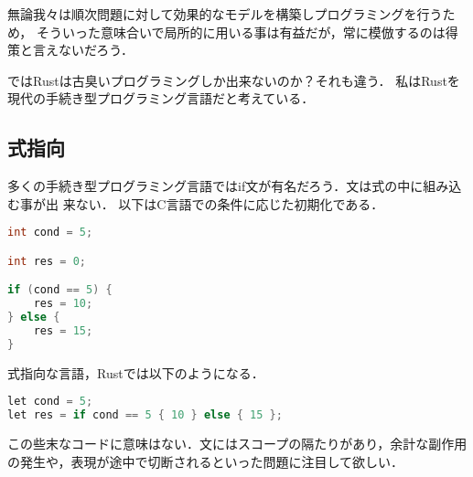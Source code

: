 無論我々は順次問題に対して効果的なモデルを構築しプログラミングを行うため，
そういった意味合いで局所的に用いる事は有益だが，常に模倣するのは得策と言えないだろう．

ではRustは古臭いプログラミングしか出来ないのか？それも違う．
私はRustを現代の手続き型プログラミング言語だと考えている．


\subsection{式指向}
多くの手続き型プログラミング言語ではif文が有名だろう．文は式の中に組み込む事が出
来ない．
以下はC言語での条件に応じた初期化である．

\begin{lstlisting}[language={C},caption=Cにおけるif文,label=c_if]
int cond = 5;

int res = 0;

if (cond == 5) {
    res = 10;
} else {
    res = 15;
}
\end{lstlisting}

式指向な言語，Rustでは以下のようになる．

\begin{lstlisting}[language={C++},caption=Rustにおけるif式,label=rust_if]
let cond = 5;
let res = if cond == 5 { 10 } else { 15 };
\end{lstlisting}

この些末なコードに意味はない．文にはスコープの隔たりがあり，余計な副作用の発生や，表現が途中で切断されるといった問題に注目して欲しい．

